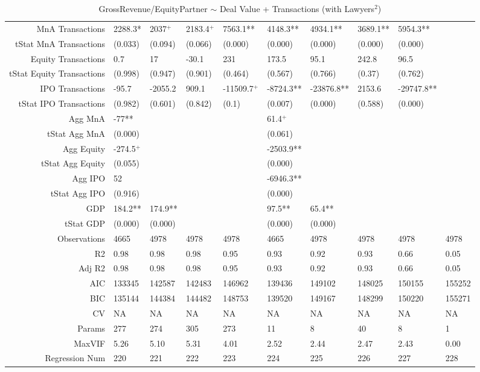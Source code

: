 \begin{table}[ht]
\begin{tabular}{rlllllllll}
  MnA Transactions & 2288.3* & 2037$^{+}$ & 2183.4$^{+}$ & 7563.1** & 4148.3** & 4934.1** & 3689.1** & 5954.3** &  \\ 
  tStat MnA Transactions & (0.033) & (0.094) & (0.066) & (0.000) & (0.000) & (0.000) & (0.000) & (0.000) &  \\ 
  Equity Transactions & 0.7 & 17 & -30.1 & 231 & 173.5 & 95.1 & 242.8 & 96.5 &  \\ 
  tStat Equity Transactions & (0.998) & (0.947) & (0.901) & (0.464) & (0.567) & (0.766) & (0.37) & (0.762) &  \\ 
  IPO Transactions & -95.7 & -2055.2 & 909.1 & -11509.7$^{+}$ & -8724.3** & -23876.8** & 2153.6 & -29747.8** &  \\ 
  tStat IPO Transactions & (0.982) & (0.601) & (0.842) & (0.1) & (0.007) & (0.000) & (0.588) & (0.000) &  \\ 
  Agg MnA & -77** &  &  &  & 61.4$^{+}$ &  &  &  &  \\ 
  tStat Agg MnA & (0.000) &  &  &  & (0.061) &  &  &  &  \\ 
  Agg Equity & -274.5$^{+}$ &  &  &  & -2503.9** &  &  &  &  \\ 
  tStat Agg Equity & (0.055) &  &  &  & (0.000) &  &  &  &  \\ 
  Agg IPO & 52 &  &  &  & -6946.3** &  &  &  &  \\ 
  tStat Agg IPO & (0.916) &  &  &  & (0.000) &  &  &  &  \\ 
  GDP & 184.2** & 174.9** &  &  & 97.5** & 65.4** &  &  &  \\ 
  tStat GDP & (0.000) & (0.000) &  &  & (0.000) & (0.000) &  &  &  \\ 
  Observations & 4665 & 4978 & 4978 & 4978 & 4665 & 4978 & 4978 & 4978 & 4978 \\ 
  R2 & 0.98 & 0.98 & 0.98 & 0.95 & 0.93 & 0.92 & 0.93 & 0.66 & 0.05 \\ 
  Adj R2 & 0.98 & 0.98 & 0.98 & 0.95 & 0.93 & 0.92 & 0.93 & 0.66 & 0.05 \\ 
  AIC & 133345 & 142587 & 142483 & 146962 & 139436 & 149102 & 148025 & 150155 & 155252 \\ 
  BIC & 135144 & 144384 & 144482 & 148753 & 139520 & 149167 & 148299 & 150220 & 155271 \\ 
  CV & NA & NA & NA & NA & NA & NA & NA & NA & NA \\ 
  Params & 277 & 274 & 305 & 273 & 11 & 8 & 40 & 8 & 1 \\ 
  MaxVIF & 5.26 & 5.10 & 5.31 & 4.01 & 2.52 & 2.44 & 2.47 & 2.43 & 0.00 \\ 
  Regression Num & 220 & 221 & 222 & 223 & 224 & 225 & 226 & 227 & 228 \\ 
   \hline
\end{tabular}
\caption{GrossRevenue/EquityPartner $\sim$ Deal Value + Transactions (with Lawyers$^2$)} 
\end{table}
